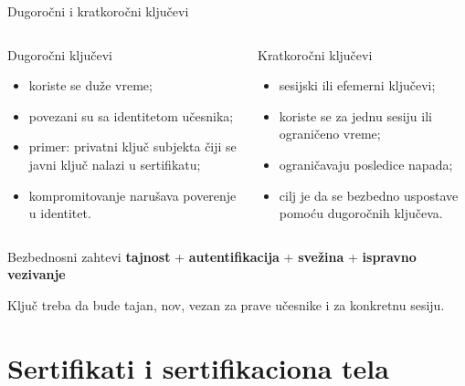 \documentclass[aspectratio=1610]{beamer}
\begin{document}
\begin{frame}[t]{Dugoročni i kratkoročni ključevi}
\small
\begin{columns}[T,onlytextwidth]
\begin{block}{Dugoročni ključevi}
\begin{itemize}
    \item koriste se duže vreme;
    \item povezani su sa identitetom učesnika;
    \item primer: privatni ključ subjekta čiji se javni ključ nalazi u sertifikatu;
    \item kompromitovanje narušava poverenje u identitet.
\end{itemize}
\end{block}

\begin{block}{Kratkoročni ključevi}
\begin{itemize}
    \item sesijski ili efemerni ključevi;
    \item koriste se za jednu sesiju ili ograničeno vreme;
    \item ograničavaju posledice napada;
    \item cilj je da se bezbedno uspostave pomoću dugoročnih ključeva.
\end{itemize}
\end{block}
\end{columns}

\vspace{0.5em}
\begin{alertblock}{Bezbednosni zahtevi}
\centering
\textbf{tajnost} \quad + \quad \textbf{autentifikacija} \quad + \quad \textbf{svežina} \quad + \quad \textbf{ispravno vezivanje}
\end{alertblock}

\vspace{0.2em}
\centering
\footnotesize
Ključ treba da bude tajan, nov, vezan za prave učesnike i za konkretnu sesiju.
\end{frame}

\section{Sertifikati i sertifikaciona tela}
\end{document}
